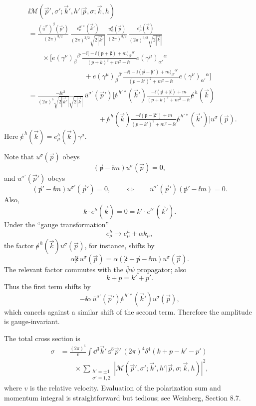 \[
\begin{aligned}
  &\ii\mathcal M(\vec p',\sigma';\vec k',h'|\vec p,\sigma;\vec k,h)
\\
  &=
  \frac{(\bar u^{\sigma'})^\beta(\vec p')}{(2\pi)^{3/2}}\,
  \frac{e_\nu^{h'*}(\vec k')}{(2\pi)^{3/2}\sqrt{2|\vec k'|}}\,
  \frac{u^\sigma_\alpha(\vec p)}{(2\pi)^{3/2}}\,
  \frac{e_\mu^h(\vec k)}{(2\pi)^{3/2}\sqrt{2|\vec k|}}
\\
  &\qquad\times
  \Biggl[
  e(\gamma^\nu)_\beta{}^{\beta'}
  \frac{-\ii\bigl(-\ii(\not p+\not k)+m\bigr)_{\beta'}{}^{\alpha'}}
       {(p+k)^2+m^2-\ii\epsilon}
  e(\gamma^\mu)_{\alpha'}{}^\alpha
\\
  &\hspace{8em}
  +
  e(\gamma^\mu)_\beta{}^{\beta'}
  \frac{-\ii\bigl(-\ii(\not p-\not k')+m\bigr)_{\beta'}{}^{\alpha'}}
       {(p-k')^2+m^2-\ii\epsilon}
  e(\gamma^\nu)_{\alpha'}{}^\alpha
  \Biggr]
\\
  &=
  \frac{-\ii e^2}{(2\pi)^6\sqrt{2|\vec k'|}\sqrt{2|\vec k|}}\,
  \bar u^{\sigma'}(\vec p')
  \Biggl[
  \not e^{\,h'*}(\vec k')
  \frac{-\ii(\not p+\not k)+m}{(p+k)^2+m^2-\ii\epsilon}
  \not e^{\,h}(\vec k)
\\
  &\hspace{10em}
  +
  \not e^{\,h}(\vec k)
  \frac{-\ii(\not p-\not k')+m}{(p-k')^2+m^2-\ii\epsilon}
  \not e^{\,h'*}(\vec k')
  \Biggr]
  u^\sigma(\vec p).
\end{aligned}
\]
Here \(\not e^{\,h}(\vec k)=e_\mu^h(\vec k)\gamma^\mu\).

Note that \(u^\sigma(\vec p)\) obeys
\[
  (\not p-\ii m)u^\sigma(\vec p)=0,
\]
and \(u^{\sigma'}(\vec p')\) obeys
\[
  (\not p'-\ii m)u^{\sigma'}(\vec p')=0,
  \qquad\Longleftrightarrow\qquad
  \bar u^{\sigma'}(\vec p')(\not p'-\ii m)=0.
\]
Also,
\[
  k\cdot e^h(\vec k)=0
  =
  k'\cdot e^{h'}(\vec k').
\]
Under the ``gauge transformation''
\[
  e_\mu^h\to e_\mu^h+\alpha k_\mu,
\]
the factor \(\not e^{\,h}(\vec k)u^\sigma(\vec p)\), for instance, shifts by
\[
  \alpha \not k\,u^\sigma(\vec p)
  =
  \alpha(\not k+\not p-\ii m)u^\sigma(\vec p).
\]
The relevant factor commutes with the \(\bar\psi\psi\) propagator; also
\[
  k+p=k'+p'.
\]
Thus the first term shifts by
\[
  -\ii\alpha\,
  \bar u^{\sigma'}(\vec p')\not e^{\,h'*}(\vec k')u^\sigma(\vec p),
\]
which cancels against a similar shift of the second term.  Therefore the
amplitude is gauge-invariant.

The total cross section is
\[
\begin{aligned}
  \sigma
  &=
  \frac{(2\pi)^6}{v}
  \int \dd^3\vec k'\,\dd^3\vec p'\,
  (2\pi)^4\delta^4(k+p-k'-p')
\\
  &\qquad\times
  \sum_{\substack{h'=\pm1\\ \sigma'=1,2}}
  \left|
    \mathcal M(\vec p',\sigma';\vec k',h'|
    \vec p,\sigma;\vec k,h)
  \right|^2 ,
\end{aligned}
\]
where \(v\) is the relative velocity.  Evaluation of the polarization sum
and momentum integral is straightforward but tedious; see Weinberg,
Section 8.7.

